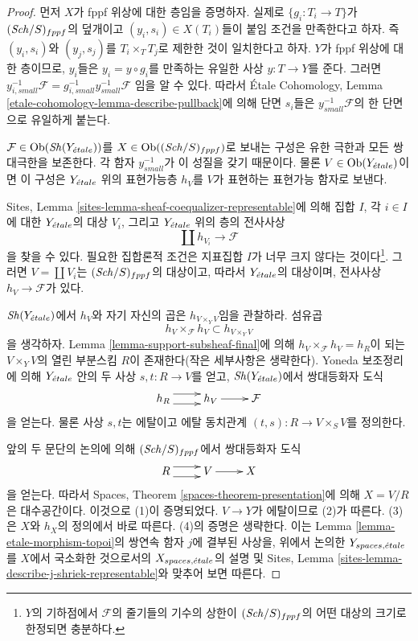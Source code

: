 \begin{proof}
먼저 $X$가 fppf 위상에 대한 층임을 증명하자. 실제로
$\{g_i : T_i \to T\}$가 $(\mathit{Sch}/S)_{fppf}$의 덮개이고
$(y_i, s_i) \in X(T_i)$들이 붙임 조건을 만족한다고 하자. 즉
$(y_i, s_i)$와 $(y_j, s_j)$를 $T_i \times_T T_j$로 제한한 것이
일치한다고 하자. $Y$가 fppf 위상에 대한 층이므로, $y_i$들은
$y_i = y \circ g_i$를 만족하는 유일한 사상 $y : T \to Y$를 준다.
그러면
$y_{i, small}^{-1}\mathcal{F} = g_{i, small}^{-1}y_{small}^{-1}\mathcal{F}$
임을 알 수 있다. 따라서 \'Etale Cohomology, Lemma
\ref{etale-cohomology-lemma-describe-pullback}에 의해 단면 $s_i$들은
$y_{small}^{-1}\mathcal{F}$의 한 단면으로 유일하게 붙는다.

\medskip\noindent
$\mathcal{F} \in \mathop{\mathrm{Ob}}\nolimits(\mathop{\mathit{Sh}}\nolimits(Y_{\acute{e}tale}))$를
$X \in \mathop{\mathrm{Ob}}\nolimits((\mathit{Sch}/S)_{fppf})$로 보내는 구성은 유한 극한과 모든
쌍대극한을 보존한다.
각 함자 $y_{small}^{-1}$가 이 성질을 갖기 때문이다. 물론
$V \in \mathop{\mathrm{Ob}}\nolimits(Y_{\acute{e}tale})$이면 이 구성은 $Y_{\acute{e}tale}$ 위의 표현가능층
$h_V$를 $V$가 표현하는 표현가능 함자로 보낸다.

\medskip\noindent
Sites, Lemma \ref{sites-lemma-sheaf-coequalizer-representable}에 의해
집합 $I$, 각 $i \in I$에 대한 $Y_{\acute{e}tale}$의 대상 $V_i$, 그리고
$Y_{\acute{e}tale}$ 위의 층의 전사사상
$$
\coprod h_{V_i} \longrightarrow \mathcal{F}
$$
을 찾을 수 있다. 필요한 집합론적 조건은 지표집합 $I$가 너무 크지
않다는 것이다\footnote{$Y$의 기하점에서 $\mathcal{F}$의 줄기들의
기수의 상한이 $(\mathit{Sch}/S)_{fppf}$의 어떤 대상의 크기로 한정되면
충분하다.}. 그러면 $V = \coprod V_i$는 $(\mathit{Sch}/S)_{fppf}$의 대상이고,
따라서 $Y_{\acute{e}tale}$의 대상이며, 전사사상 $h_V \to \mathcal{F}$가 있다.

\medskip\noindent
$\mathop{\mathit{Sh}}\nolimits(Y_{\acute{e}tale})$에서 $h_V$와 자기 자신의 곱은
$h_{V \times_Y V}$임을 관찰하라. 섬유곱
$$
h_V \times_\mathcal{F} h_V \subset h_{V \times_Y V}
$$
을 생각하자. Lemma \ref{lemma-support-subsheaf-final}에 의해
$h_V \times_\mathcal{F} h_V = h_R$이 되는 $V \times_Y V$의 열린
부분스킴 $R$이 존재한다(작은 세부사항은 생략한다). Yoneda 보조정리에
의해 $Y_{\acute{e}tale}$ 안의 두 사상 $s, t : R \to V$를 얻고,
$\mathop{\mathit{Sh}}\nolimits(Y_{\acute{e}tale})$에서 쌍대등화자 도식
$$
\xymatrix{
h_R \ar@<1ex>[r] \ar@<-1ex>[r] &
h_V \ar[r] &
\mathcal{F}
}
$$
을 얻는다. 물론 사상 $s, t$는 에탈이고 에탈 동치관계
$(t, s) : R \to V \times_S V$를 정의한다.

\medskip\noindent
앞의 두 문단의 논의에 의해 $(\mathit{Sch}/S)_{fppf}$에서 쌍대등화자 도식
$$
\xymatrix{
R \ar@<1ex>[r] \ar@<-1ex>[r] &
V \ar[r] &
X
}
$$
을 얻는다. 따라서 Spaces, Theorem \ref{spaces-theorem-presentation}에 의해
$X = V/R$은 대수공간이다. 이것으로 (1)이 증명되었다. $V \to Y$가
에탈이므로 (2)가 따른다. (3)은 $X$와 $h_X$의 정의에서 바로 따른다.
(4)의 증명은 생략한다. 이는 Lemma \ref{lemma-etale-morphism-topoi}의
쌍연속 함자 $j$에 결부된 사상을, 위에서 논의한 $Y_{spaces, {\acute{e}tale}}$를
$X$에서 국소화한 것으로서의 $X_{spaces, {\acute{e}tale}}$의 설명 및 Sites,
Lemma \ref{sites-lemma-describe-j-shriek-representable}와 맞추어 보면 따른다.
\end{proof}


